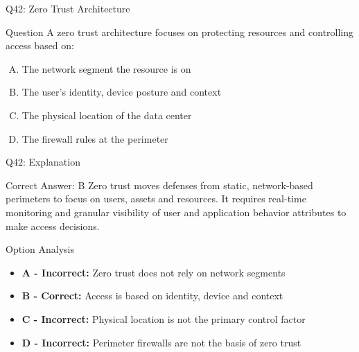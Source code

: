 \documentclass{beamer}
\begin{document}
	\begin{frame}{Q42: Zero Trust Architecture}
		\begin{block}{Question}
			A zero trust architecture focuses on protecting resources and controlling access based on:
		\end{block}
		\begin{enumerate}[(A)]
			\item The network segment the resource is on
			\item The user's identity, device posture and context
			\item The physical location of the data center
			\item The firewall rules at the perimeter
		\end{enumerate}
	\end{frame}
	
	\begin{frame}{Q42: Explanation}
		\begin{block}{Correct Answer: B}
			Zero trust moves defenses from static, network-based perimeters to focus on users, assets and resources. It requires real-time monitoring and granular visibility of user and application behavior attributes to make access decisions.
		\end{block}
		\begin{block}{Option Analysis}
			\begin{itemize}
				\item \textbf{A - Incorrect:} Zero trust does not rely on network segments
				\item \textbf{B - Correct:} Access is based on identity, device and context
				\item \textbf{C - Incorrect:} Physical location is not the primary control factor
				\item \textbf{D - Incorrect:} Perimeter firewalls are not the basis of zero trust
			\end{itemize}
		\end{block}
	\end{frame}
	
	
\end{document}
